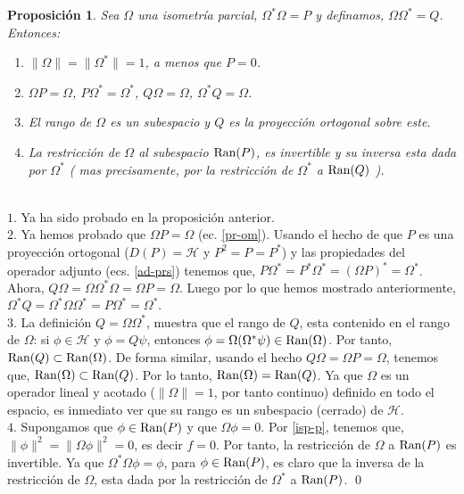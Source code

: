 \documentclass[12pt]{book}
\numberwithin{equation}{chapter}
\newtheorem{proposition}[theorem]{Proposici\'on}
\def\n{\noindent}
\def\H{\mathcal{H}}
\def\O{\Omega}
\begin{document}
\begin{proposition}\label{isop-ps}
Sea $\O$ una isometr\'ia parcial, $ \O^{*}\O=P $ y definamos, $ \O \O^{*}= Q $. Entonces:
\begin{enumerate}
\item $ \| \O \|= \| \O^{*} \|=1 $, a menos que $P=0$.

\item $ \O P = \O $, $ P\O^{*}= \O^{*} $, $ Q \O = \O $, $ \O^{*}Q= \O $. 

\item El rango de $\O$ es un subespacio y $Q$ es la proyecci\'on ortogonal sobre este.

\item La restricci\'on de $\O$ al subespacio $ \hbox{Ran}(P) $, es invertible y su inversa esta dada por $\O^{*}$ ( mas precisamente, por la restricci\'on de $\O^{*}$ a $\hbox{Ran}(Q)$ ).
\end{enumerate}
\end{proposition}
\n {\bf Demostraci\'on}\\
$1.$ Ya ha sido probado en la proposici\'on anterior.\\
$2.$ Ya hemos probado que $\O P = \O$ (ec. \eqref{pr-om}). Usando el hecho de que $P$ es una proyecci\'on ortogonal ($D(P)=\H$ y $P^{2}=P=P^{*}$) y las propiedades del operador adjunto (ecs. \eqref{ad-prs}) tenemos que, $ P\O^{*}=P^{*} \O^{*}= (\O P)^{*}= \O^{*} $. Ahora, $ Q\O= \O \O^{*} \O=\O P=\O $. Luego por lo que hemos mostrado anteriormente, $ \O^{*}Q= \O^{*} \O \O^{*}= P \O^{*}= \O^{*} $.\\
$3.$ La definici\'on $ Q= \O \O^{*} $, muestra que el rango de $Q$, esta contenido en el rango de $\O$: si $\phi \in \H$ y $ \phi = Q \psi $, entonces $ \phi= \O ( \O^{*}\psi ) \in \hbox{Ran}(\O) $. Por tanto, $ \hbox{Ran}(Q) \subset \hbox{Ran}(\O) $. De forma similar, usando el hecho $ Q\O = \O P =\O $, tenemos que, $\hbox{Ran}(\O) \subset \hbox{Ran}(Q)  $. Por lo tanto, $\hbox{Ran}(\O)= \hbox{Ran}(Q)$. Ya que $\O$ es un operador lineal y acotado ($\| \O \|=1$, por tanto continuo) definido en todo el espacio, es inmediato ver que su rango es un subespacio (cerrado) de $\H$.\\
$4.$ Supongamos que $\phi \in \hbox{Ran}(P)$ y que $\O \phi = 0$. Por \eqref{isp-p}, tenemos que, $\| \phi \|^{2}= \| \O \phi \|^{2}=0 $, es decir $ f=0 $. Por tanto, la restricci\'on de $\O$ a $\hbox{Ran}(P)$ es invertible. Ya que $ \O^{*} \O \phi = \phi $, para $ \phi \in \hbox{Ran}(P) $, es claro que la inversa de la restricci\'on de $\O$, esta dada por la restricci\'on de $\O^{*}$ a $ \hbox{Ran}(P) $.  \qed
\end{document}
